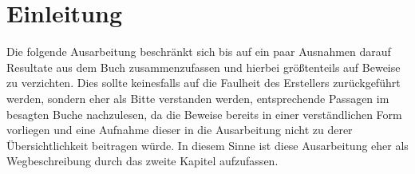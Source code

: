 \section*{Einleitung}

Die folgende Ausarbeitung beschränkt sich bis auf ein paar Ausnahmen darauf Resultate aus dem Buch \cite{preuss} zusammenzufassen und hierbei größtenteils auf Beweise zu verzichten. 
Dies sollte keinesfalls auf die Faulheit des Erstellers zurückgeführt werden, sondern eher als Bitte verstanden werden, entsprechende Passagen im besagten Buche nachzulesen, da die Beweise bereits in einer verständlichen Form vorliegen und eine Aufnahme dieser in die Ausarbeitung nicht zu derer Übersichtlichkeit beitragen würde.
In diesem Sinne ist diese Ausarbeitung eher als Wegbeschreibung durch das zweite Kapitel aufzufassen.
